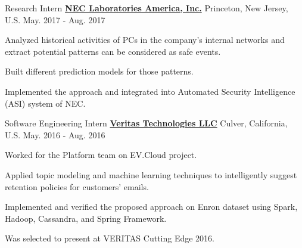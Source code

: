 

\begin{cventries}
\cventry
{Research Intern} %
{\href{http://www.nec-labs.com/}{\bf NEC Laboratories America, Inc.}}  %
{Princeton, New Jersey, U.S.} %
{May. 2017 - Aug. 2017} %
{
	\begin{cvitems} %
		\item Analyzed historical activities of PCs in the company's internal networks and extract potential patterns can be considered as safe events.
		\item Built different prediction models for those patterns.
		\item Implemented the approach and integrated into Automated Security Intelligence (ASI) system of NEC.
	\end{cvitems}
}
	
	
\cventry
{Software Engineering Intern} %
{\href{https://www.veritas.com/}{\bf Veritas Technologies LLC}}  %
{Culver, California, U.S.} %
{May. 2016 - Aug. 2016} %
{
	\begin{cvitems} %
		\item Worked for the Platform team on EV.Cloud project.
		\item Applied topic modeling and machine learning techniques to intelligently suggest retention policies for customers' emails.
		\item Implemented and verified the proposed approach on Enron dataset using Spark, Hadoop, Cassandra, and Spring Framework.
		\item Was selected to present at VERITAS Cutting Edge 2016.
	\end{cvitems}
}


\end{cventries}
